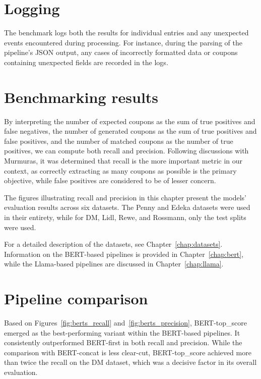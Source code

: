 \documentclass[licencjacka,en]{pracamgr}
\begin{document}
\section{Logging}

The benchmark logs both the results for individual entries and any unexpected events encountered during processing. For instance, during the parsing of the pipeline’s JSON output, any cases of incorrectly formatted data or coupons containing unexpected fields are recorded in the logs.

\section{Benchmarking results} \label{benchmarkResults}

By interpreting the number of expected coupons as the sum of true positives and false negatives, the number of generated coupons as the sum of true positives and false positives, and the number of matched coupons as the number of true positives, we can compute both recall and precision. Following discussions with Murmuras, it was determined that recall is the more important metric in our context, as correctly extracting as many coupons as possible is the primary objective, while false positives are considered to be of lesser concern.

The figures illustrating recall and precision in this chapter present the models' evaluation results across six datasets. The Penny and Edeka datasets were used in their entirety, while for DM, Lidl, Rewe, and Rossmann, only the test splits were used.

For a detailed description of the datasets, see Chapter~\ref{chap:datasets}. Information on the BERT-based pipelines is provided in Chapter~\ref{chap:bert}, while the Llama-based pipelines are discussed in Chapter~\ref{chap:llama}.

\section{Pipeline comparison}

Based on Figures~\ref{fig:berts_recall} and~\ref{fig:berts_precision}, BERT-top\_score emerged as the best-performing variant within the BERT-based pipelines. It consistently outperformed BERT-first in both recall and precision. While the comparison with BERT-concat is less clear-cut, BERT-top\_score achieved more than twice the recall on the DM dataset, which was a decisive factor in its overall evaluation.
\end{document}
